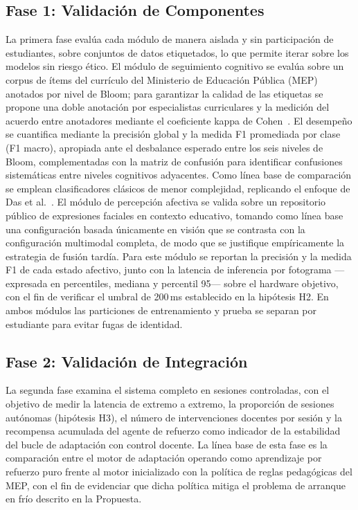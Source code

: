 \subsection{Fase 1: Validación de Componentes}

La primera fase evalúa cada módulo de manera aislada y sin participación de
estudiantes, sobre conjuntos de datos etiquetados, lo que permite iterar sobre
los modelos sin riesgo ético. El módulo de seguimiento cognitivo se evalúa sobre
un corpus de ítems del currículo del Ministerio de Educación Pública (MEP)
anotados por nivel de Bloom; para garantizar la calidad de las etiquetas se
propone una doble anotación por especialistas curriculares y la medición del
acuerdo entre anotadores mediante el coeficiente kappa de
Cohen~\cite{Cohen1960}. El desempeño se cuantifica mediante la precisión global
y la medida F1 promediada por clase (F1 macro), apropiada ante el desbalance
esperado entre los seis niveles de Bloom, complementadas con la matriz de
confusión para identificar confusiones sistemáticas entre niveles cognitivos
adyacentes. Como línea base de comparación se emplean clasificadores clásicos de
menor complejidad, replicando el enfoque de Das et al.~\cite{Das2020}. El módulo
de percepción afectiva se valida sobre un repositorio público de expresiones
faciales en contexto educativo, tomando como línea base una configuración basada
únicamente en visión que se contrasta con la configuración multimodal completa,
de modo que se justifique empíricamente la estrategia de fusión tardía. Para
este módulo se reportan la precisión y la medida F1 de cada estado afectivo,
junto con la latencia de inferencia por fotograma ---expresada en percentiles,
mediana y percentil 95--- sobre el hardware objetivo, con el fin de verificar el
umbral de 200\,ms establecido en la hipótesis H2. En ambos módulos las
particiones de entrenamiento y prueba se separan por estudiante para evitar
fugas de identidad.

\subsection{Fase 2: Validación de Integración}

La segunda fase examina el sistema completo en sesiones controladas, con el
objetivo de medir la latencia de extremo a extremo, la proporción de sesiones
autónomas (hipótesis H3), el número de intervenciones docentes por sesión y la
recompensa acumulada del agente de refuerzo como indicador de la estabilidad del
bucle de adaptación con control docente. La línea base de esta fase es la
comparación entre el motor de adaptación operando como aprendizaje por refuerzo
puro frente al motor inicializado con la política de reglas pedagógicas del MEP,
con el fin de evidenciar que dicha política mitiga el problema de arranque en
frío descrito en la Propuesta.


